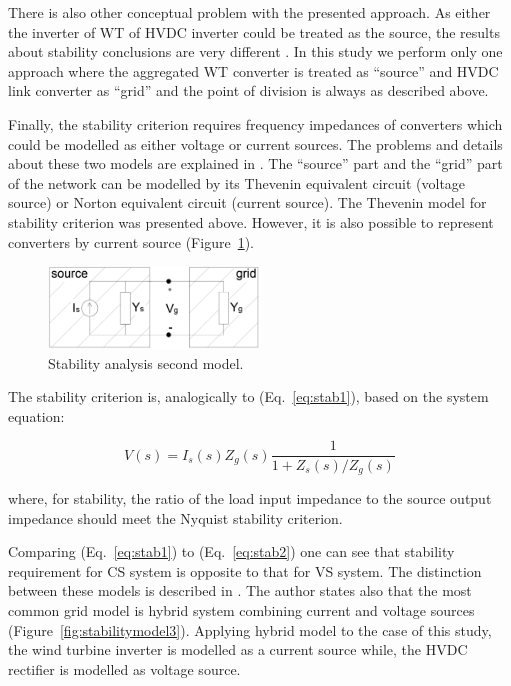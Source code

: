 \documentclass[12pt]{report} %
\begin{document}
There is also other conceptual problem with the presented approach. As either the inverter of WT of HVDC inverter could be treated as the source, the results about stability conclusions are very different \cite{sun2011}. In this study we perform only one approach where the aggregated WT converter is treated as “source” and HVDC link converter as “grid” and the point of division is always as described above.

Finally, the stability criterion requires frequency impedances of converters which could be modelled as either voltage or current sources. The problems and details about these two models are explained in \cite{sun2011}. The “source” part and the “grid” part of the network can be modelled by its Thevenin equivalent circuit (voltage source) or Norton equivalent circuit (current source). 
The Thevenin model for stability criterion was presented above. However, it is also possible to represent converters by current source \cite{sun2011} (Figure~\ref{fig:stabilitymodel2}).

\begin{figure}[htb]
	\centering
    	\includegraphics[width=0.5\textwidth]{img/theory/stability_model2.png}
  	\caption{Stability analysis second model.}
  	\label{fig:stabilitymodel2}
\end{figure}
\FloatBarrier

The stability criterion is, analogically to (Eq.~\ref{eq:stab1}), based on the system equation:

\begin{equation} \label{eq:stab2}
	V(s)=I_s (s)Z_g (s) \dfrac{1}{1+Z_s (s)/Z_g (s)}
\end{equation}

where, for stability, the ratio of the load input impedance to the source output impedance should meet the Nyquist stability criterion.

Comparing (Eq.~\ref{eq:stab1}) to (Eq.~\ref{eq:stab2}) one can see that stability requirement for CS system is opposite to that for VS system. The distinction between these models is described in \cite{sun2011}. The author states also that the most common grid model is hybrid system combining current and voltage sources (Figure~\ref{fig:stabilitymodel3}). Applying hybrid model to the case of this study, the wind turbine inverter is modelled as a current source while, the HVDC rectifier is modelled as voltage source.
\end{document}
